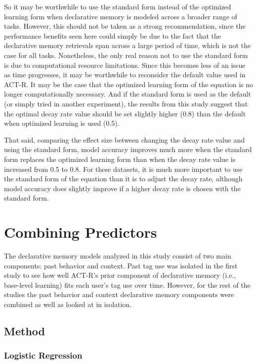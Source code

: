 \documentclass[man,floatsintext,donotrepeattitle]{apa6}
\begin{document}
So it may be worthwhile to use the standard form instead of the optimized learning form when declarative memory is modeled across a broader range of tasks.
However, this should not be taken as a strong recommendation,
since the performance benefits seen here could simply be due to the fact that the declarative memory retrievals span across a large period of time, which is not the case for all tasks.
Nonetheless, the only real reason not to use the standard form is due to computational resource limitations.
Since this becomes less of an issue as time progresses, it may be worthwhile to reconsider the default value used in ACT-R.
It may be the case that the optimized learning form of the equation is no longer computationally necessary.
And if the standard form is used as the default (or simply tried in another experiment),
the results from this study suggest that the optimal decay rate value should be set slightly higher (0.8) than the default when optimized learning is used (0.5).

That said, comparing the effect size between changing the decay rate value and using the standard form,
model accuracy improves much more when the standard form replaces the optimized learning form than when the decay rate value is increased from 0.5 to 0.8.
For these datasets, it is much more important to use the standard form of the equation than it is to adjust the decay rate, although model accuracy does slightly improve if a higher decay rate is chosen with the standard form.

\section{Combining Predictors}

The declarative memory models analyzed in this study consist of two main components: past behavior and context.
Past tag use was isolated in the first study to see how well ACT-R's prior component of declarative memory (i.e., base-level learning) fits each user's tag use over time.
However, for the rest of the studies the past behavior and context declarative memory components were combined as well as looked at in isolation.

\subsection{Method}

\subsubsection{Logistic Regression}
\end{document}

